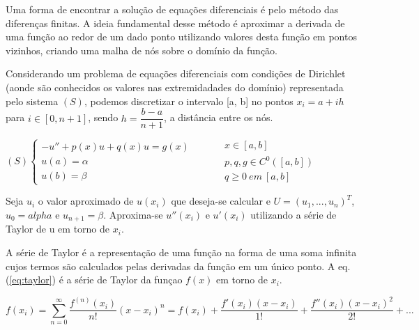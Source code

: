 \par Uma forma de encontrar a solução de equações diferenciais é pelo método das diferenças finitas. A ideia fundamental desse método é aproximar a derivada de uma função ao redor de um dado ponto utilizando valores desta função em pontos vizinhos, criando uma malha de nós sobre o domínio da função.
\par Considerando um problema de equações diferenciais com condições de Dirichlet (aonde são conhecidos os valores nas extremidadades do domínio) representada pelo sistema $(S)$, podemos discretizar o intervalo [a, b] no pontos $x_i = a + ih$ para $i \in [0, n+1]$, sendo $h = \dfrac{b-a}{n+1}$, a distância entre os nós.

\begin{center}
	\begin{math}
		(S)
		\left\{
    		\begin{array}{l}
      			-u'' + p(x)u + q(x)u = g(x) \\
				u(a) = \alpha\\
				u(b) = \beta      			
    		\end{array}
    		\begin{array}{l}
      		\qquad \\
			\qquad \\
			\qquad	   
    		\end{array}
    		\begin{array}{l}
      			x \in [a, b] \\
				p, q, g \in C^0([a, b])\\
				q \geq 0 \ em \ [a, b]
    		\end{array}
		\right.
	\end{math}
\end{center} 

\par Seja $u_i$ o valor aproximado de $u(x_i)$ que deseja-se calcular e $U = (u_1, ..., u_n)^T$, $u_0 = alpha$ e $u_{n+1} = \beta$. Aproxima-se $u''(x_i)$ e $u'(x_i)$ utilizando a série de Taylor de u em torno de $x_i$.
\par A série de Taylor é a representação de uma função na forma de uma soma infinita cujos termos são calculados pelas derivadas da função em um único ponto.
A eq.(\ref{eq:taylor}) é a série de Taylor da funçao $f(x)$ em torno de $x_i$.

\begin{equation} \label{eq:taylor}
f(x_i) = \sum_{n=0}^\infty \dfrac{f^{(n)}(x_i)}{n!}(x-x_i)^n = f(x_i) + \dfrac{f'(x_i)(x-x_i)}{1!} + \dfrac{f''(x_i)(x-x_i)^2}{2!} + ...
\end{equation}

